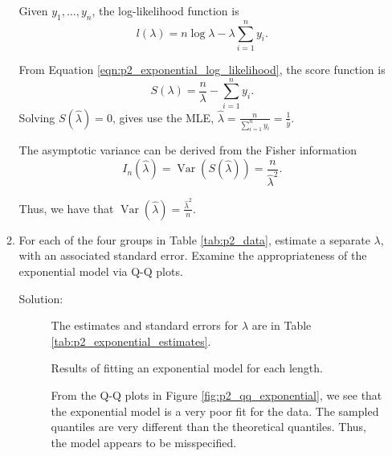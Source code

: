 \documentclass[letterpaper,11pt]{article}
\begin{document}
\begin{enumerate}
\begin{enumerate}
      Given $y_1,\ldots,y_n$, the log-likelihood function is
      \begin{equation}
        l\left(\lambda\right) = n\log\lambda - \lambda\sum_{i=1}^n y_i.
        \label{eqn:p2_exponential_log_likelihood}
      \end{equation}

      From Equation \ref{eqn:p2_exponential_log_likelihood}, the score function is
      \begin{equation}
        S\left(\lambda\right) = \frac{n}{\lambda} - \sum_{i=1}^n y_i.
        \label{eqn:p2_exponential_score}
      \end{equation}
      Solving $S\left(\hat{\lambda}\right) = 0$, gives use the MLE,
      $\boxed{\hat{\lambda} = \frac{n}{\sum_{i=1}^n y_i} = \frac{1}{\bar{y}}.}$

      The asymptotic variance can be derived from the Fisher information
      \begin{equation}
        I_n\left(\hat{\lambda}\right)
        = \operatorname{Var}\left(S\left(\hat{\lambda}\right)\right)
        = \frac{n}{\hat{\lambda}^2}.
      \end{equation}

      Thus, we have that
      $\boxed{\operatorname{Var}\left(\hat{\lambda}\right) =
        \frac{\hat{\lambda}^2}{n}.}$      
      
    \item For each of the four groups in Table \ref{tab:p2_data}, estimate a
      separate $\lambda$, with an associated standard error. Examine the
      appropriateness of the exponential model via Q-Q plots.

      \begin{description}
      \item[Solution:] The estimates and standard errors for $\lambda$ are in
        Table \ref{tab:p2_exponential_estimates}.

        \begin{table}
          \centering
          
          \caption{Results of fitting an exponential model for each length.}
          \label{tab:p2_exponential_estimates}
        \end{table}

        From the Q-Q plots in Figure \ref{fig:p2_qq_exponential}, we see that
        the exponential model is a very poor fit for the data. The sampled
        quantiles are very different than the theoretical quantiles. Thus, the
        model appears to be misspecified.


\end{description}
\end{enumerate}
\end{enumerate}
\end{document}
